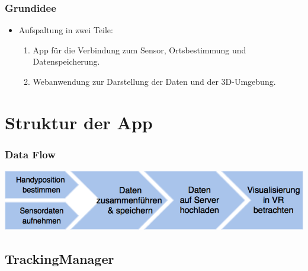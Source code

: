 \documentclass{beamer}
\begin{document}
\begin{frame}
\frametitle{Grundidee}
\begin{itemize}
	\item Aufspaltung in zwei Teile: \pause
  \begin{enumerate}
    \item App für die Verbindung zum Sensor, Ortsbestimmung und Datenspeicherung.
    \item Webanwendung zur Darstellung der Daten und der 3D-Umgebung.
  \end{enumerate}
\end{itemize}
\end{frame}


\section{Struktur der App}

\begin{frame}
\frametitle{Data Flow}
\begin{center}
	\includegraphics[width=\textwidth]{diagram/dataflow.png}
\end{center}
\end{frame}




\subsection{TrackingManager}
\end{document}
